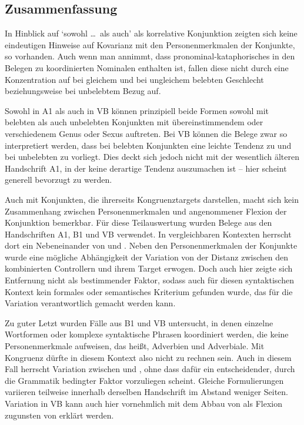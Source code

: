 \subsection{Zusammenfassung}

In Hinblick auf  `sowohl \dots\ als auch' als
korrelative Konjunktion zeigten sich keine eindeutigen Hinweise auf Kovarianz
mit den Personenmerkmalen der Konjunkte, so vorhanden. Auch wenn man annimmt,
dass pronominal-kataphorisches  in den Belegen zu koordinierten
Nominalen enthalten ist, fallen diese nicht durch eine Konzentration auf
 bei gleichem und  bei ungleichem belebten Geschlecht
beziehungsweise bei unbelebtem Bezug auf.

Sowohl in A1 als auch in VB können prinzipiell beide
Formen sowohl mit belebten als auch unbelebten Konjunkten mit
über\-einstim\-mendem oder verschiedenem Genus oder Sexus auftreten. Bei
VB können die Belege zwar so interpretiert werden, dass bei belebten
Konjunkten eine leichte Tendenz zu  und bei unbelebten zu
 vorliegt. Dies deckt sich jedoch nicht mit der wesentlich älteren
Handschrift A1, in der keine derartige Tendenz auszumachen ist --
hier scheint generell  bevorzugt zu werden.

Auch mit Konjunkten, die ihrerseits Kongruenztargets darstellen, macht sich
kein Zusammen\-hang zwischen Personen\-merkmalen und angenommener Flexion der
Konjunktion bemerkbar. Für diese Teilauswertung wurden Belege aus den
Handschriften A1, B1 und VB verwendet. In
vergleichbaren Kontexten herrscht dort ein Nebeneinander von  und
. Neben den Personenmerkmalen der Konjunkte wurde eine mögliche
Abhängigkeit der Variation von der Distanz zwischen den kombinierten
Controllern und ihrem Target erwogen. Doch auch hier zeigte sich Entfernung
nicht als bestimmender Faktor, sodass auch für diesen syntaktischen Kontext kein
formales oder semantisches Kriterium gefunden wurde, das für die Variation
verantwortlich gemacht werden kann.

Zu guter Letzt wurden Fälle aus B1 und VB untersucht, in
denen einzelne Wortformen oder komplexe syntaktische Phrasen koordiniert werden,
die keine Personenmerkmale aufweisen, das heißt, Adverbien und Adverbiale. Mit
Kongruenz dürfte in diesem Kontext also nicht zu rechnen sein. Auch in diesem
Fall herrscht Variation zwischen  und , ohne dass
dafür ein entscheidender, durch die Grammatik bedingter Faktor vorzuliegen
scheint. Gleiche Formulierungen variieren teilweise innerhalb derselben
Handschrift im Abstand weniger Seiten. Variation in VB kann auch
hier vornehmlich mit dem Abbau von  als Flexion zugunsten von
 erklärt werden.
